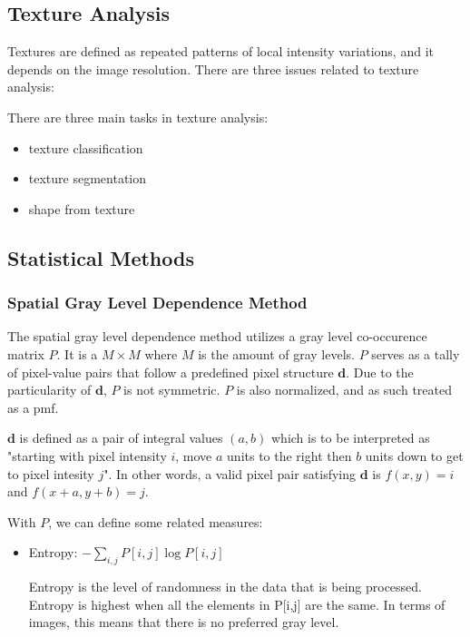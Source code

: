 \documentclass{article}
\begin{document}
\begin{multicols}{2}
\section{Texture Analysis}

Textures are defined as repeated patterns of local intensity variations, and it depends on the image resolution.
There are three issues related to texture analysis:

There are three main tasks in texture analysis:
\begin{itemize}
  \item {texture classification}
  \item {texture segmentation}
  \item {shape from texture}
\end{itemize}

\subsection{Statistical Methods}

\subsubsection{Spatial Gray Level Dependence Method}

The spatial gray level dependence method utilizes a gray level co-occurence matrix $P$. It is a $M \times M$ where $M$ is the amount of gray levels. $P$ serves as a tally of pixel-value pairs that follow a predefined pixel structure $\mathbf{d}$. Due to the particularity of $\mathbf{d}$, $P$ is not symmetric. $P$ is also normalized, and as such treated as a pmf.

$\mathbf{d}$ is defined as a pair of integral values $(a,b)$ which is to be interpreted as "starting with pixel intensity $i$, move $a$ units to the right then $b$ units down to get to pixel intesity $j$". In other words, a valid pixel pair satisfying $\mathbf{d}$ is $f(x,y)=i$ and $f(x+a,y+b)=j$.

With $P$, we can define some related measures:

\begin{itemize}
\item Entropy: $-\sum_{i,j} P[i,j] \log P[i,j]$

Entropy is the level of randomness in the data that is being processed. Entropy is highest when all the elements in P[i,j] are the same. In terms of images, this means that there is no preferred gray level.


\end{itemize}
\end{multicols}
\end{document}
